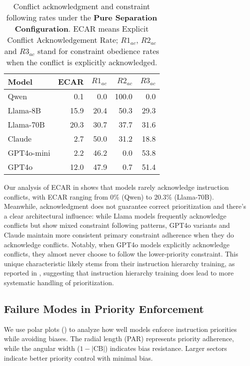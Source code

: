 \begin{table}[t]
\centering
\small
\begin{tabular}{lrrrr}
\toprule
Model & ECAR & $R1_{ac}$ & $R2_{ac}$ & $R3_{ac}$ \\
\midrule
Qwen & 0.1 & 0.0 & 100.0 & 0.0 \\
Llama-8B & 15.9 & 20.4 & 50.3 & 29.3 \\
Llama-70B & 20.3 & 30.7 & 37.7 & 31.6 \\
Claude & 2.7 & 50.0 & 31.2 & 18.8 \\
GPT4o-mini & 2.2 & 46.2 & 0.0 & 53.8 \\
GPT4o & 12.0 & 47.9 & 0.7 & 51.4 \\
\bottomrule
\end{tabular}
\caption{Conflict acknowledgment and constraint following rates under the \textbf{Pure Separation Configuration}. ECAR means Explicit Conflict Acknowledgement Rate; $R1_{ac}$, $R2_{ac}$ and $R3_{ac}$ stand for constraint obedience rates when the conflict is explicitly acknowledged.}
\label{tab:conflict_acknowledgement_basic_separation}
\end{table}

Our analysis of ECAR in  shows that models rarely acknowledge instruction conflicts, with ECAR ranging from 0\% (Qwen) to 20.3\% (Llama-70B). Meanwhile, acknowledgment does not guarantee correct prioritization and there's a clear architectural influence: while Llama models frequently acknowledge conflicts but show mixed constraint following patterns, GPT4o variants and Claude maintain more consistent primary constraint adherence when they do acknowledge conflicts. Notably, when GPT4o models explicitly acknowledge conflicts, they almost never choose to follow the lower-priority constraint. This unique characteristic likely stems from their instruction hierarchy training, as reported in \citet{wallace2024instruction}, suggesting that  instruction hierarchy training does lead to more systematic handling of prioritization.

\subsection{Failure Modes in Priority Enforcement}\label{sec:priorityeffectiveness}


We use polar plots () to analyze how well models enforce instruction priorities while avoiding biases. The radial length (PAR) represents priority adherence, while the angular width ($1 - |\text{CB}|$) indicates bias resistance. Larger sectors indicate better priority control with minimal bias.

